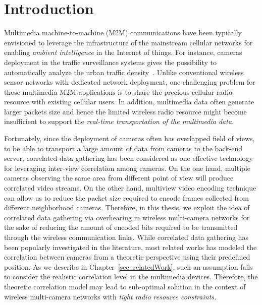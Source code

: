 \section{Introduction}
\label{sec::introduction}
Multimedia machine-to-machine (M2M) communications have been typically envisioned to leverage the infrastructure of the mainstream cellular networks for enabling {\em ambient intelligence} in the Internet of things.
For instance, cameras deployment in the traffic surveillance systems gives the possibility to automatically analyze the urban traffic density~\cite{Kapsch,Traficon,Citilog}.
%
Unlike conventional wireless sensor networks with dedicated network deployment, one challenging problem for those multimedia M2M applications is to share the precious cellular radio resource with existing cellular users.
%
In addition, multimedia data often generate larger packets size and hence the limited wireless radio resource might become insufficient to support the {\em real-time transportation of the multimedia data}.

Fortunately, since the deployment of cameras often has overlapped field of views, to be able to transport a large amount of data from cameras to the back-end server, correlated data gathering has been considered as one effective technology for leveraging inter-view correlation among cameras.
On the one hand, multiple cameras observing the same area from different point of view will produce correlated video streams. 
On the other hand, multiview video encoding technique can allow us to reduce the packet size required to encode frames collected from different neighborhood cameras.
Therefore, in this thesis, we exploit the idea of correlated data gathering via overhearing in wireless multi-camera networks for the sake of reducing the amount of encoded bits required to be transmitted through the wireless communication links.
%
While correlated data gathering has been popularly investigated in the literature, most related works has modeled the correlation between cameras from a theoretic perspective using their predefined position.
As we describe in Chapter~\ref{sec::relatedWork}, such an assumption fails to consider the realistic correlation level in the multimedia devices.
Therefore, the theoretic correlation model may lead to sub-optimal solution in the context of wireless multi-camera networks with {\em tight radio resource constraints.}

